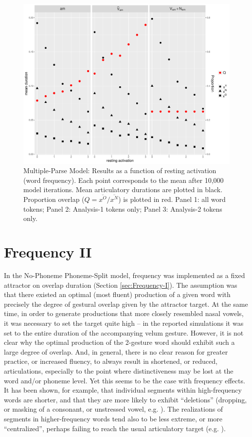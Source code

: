 \begin{figure}[h]
\includegraphics[width=.60\textwidth]{figures/MultipleParseResults.pdf}
\caption{\label{fig:Multiple-Parse-Results}Multiple-Parse Model: Results as
a function of resting activation (word frequency). Each point corresponds
to the mean after 10,000 model iterations. Mean articulatory durations
are plotted in black. Proportion overlap ($Q={\overline{x^{O}}}/{\overline{x^{N}}}$)
is plotted in red. Panel 1: all word tokens; Panel 2: Analysis-1 tokens
only; Panel 3: Analysis-2 tokens only.}
\end{figure}


\section{\label{sec:Frequency-II}Frequency II}

In the No-Phoneme Phoneme-Split model, frequency was implemented as
a fixed attractor on overlap duration (Section \ref{sec:Frequency-I}).
The assumption was that there existed an optimal (most fluent) production
of a given word with precisely the degree of gestural overlap given
by the attractor target. At the same time, in order to generate productions
that more closely resembled nasal vowels, it was necessary to set
the target quite high – in the reported simulations it was set to
the entire duration of the accompanying velum gesture. However, it
is not clear why the optimal production of the 2-gesture word should
exhibit such a large degree of overlap. And, in general, there is
no clear reason for greater practice, or increased fluency, to always
result in shortened, or reduced, articulations, especially to the
point where distinctiveness may be lost at the word and/or phoneme
level. Yet this seems to be the case with frequency effects. It has
been shown, for example, that individual segments within high-frequency
words are shorter, and that they are more likely to exhibit “deletions”
(dropping, or masking of a consonant, or unstressed vowel, e.g.
\citealt{Bell2003,Raymond2006,Bybee2008}). The realizations of segments
in higher-frequency words tend also to be less extreme, or more “centralized”,
perhaps failing to reach the usual articulatory target (e.g. \citealt{munson2004effect,Scarborough2004,gahl2008time}).

